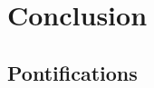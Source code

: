 \chapter{Conclusion}
\label{chapter:Conclusion}
\thispagestyle{myheadings}

\graphicspath{{3_Conclusion/Figures/}}

\section{Pontifications}

